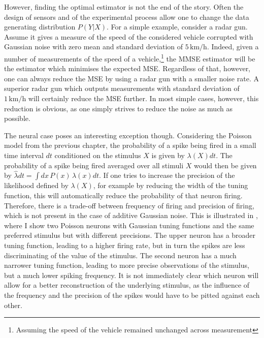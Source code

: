 However, finding the optimal estimator is not the end of the story. Often the design of sensors and of the experimental process allow one to change the data 
generating distribution $P(Y|X)$. For a simple example, consider a radar gun. Assume it gives a measure of the speed of the considered vehicle corrupted  with 
Gaussian noise with zero mean and standard deviation of $5\,\textrm{km/h}$. Indeed, given a number of measurements of the speed of a 
vehicle,\footnote{Assuming the speed of the vehicle remained unchanged across measurement} the MMSE estimator will be the estimator which minimises the 
expected 
MSE. Regardless of that, however, one can always reduce the MSE by using a radar gun with a smaller noise rate. A superior radar gun which outputs 
measurements with standard deviation of $1\,\textrm{km/h}$ will certainly reduce the MSE further. In most simple cases, however, this reduction is obvious, as one 
simply strives to reduce the noise as much as possible.
\par

The neural case poses an interesting exception though. Considering the Poisson model from the previous chapter, the probability of a spike being fired in a small time 
interval $dt$ conditioned on the stimulus $X$ is given by $\lambda(X)dt$. The probability of a spike being fired averaged over all stimuli $X$ would then be given by
$\hat{\lambda}dt = \int dx\, P(x)\, \lambda(x)dt$. If one tries to increase the precision of the likelihood defined by $\lambda(X)$, for example by reducing the 
width of the tuning function, this will automatically reduce the probability of that neuron firing. Therefore, there is a trade-off between frequency of firing and precision of 
firing, which is not present in the case of additive Gaussian noise. This is illustrated in , where I show two Poisson neurons with Gaussian tuning functions
and the same preferred stimulus but with different precisions. The upper neuron has a broader tuning function, leading to a higher firing rate, but in turn the spikes are less 
discriminating of the value of the stimulus. The second neuron has a much narrower tuning function, leading to more precise observations of the stimulus, but a much lower
spiking frequency. It is not immediately clear which neuron will allow for a better reconstruction of the underlying stimulus, as the influence of the frequency and the precision
of the spikes would have to be pitted against each other.
\par

